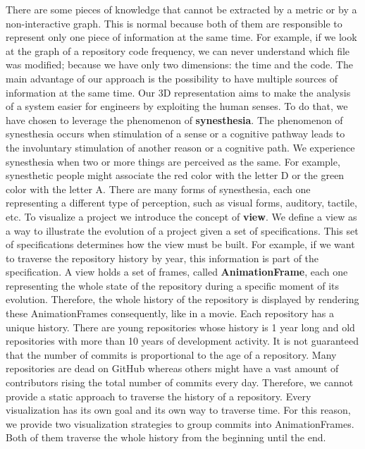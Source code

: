 There are some pieces of knowledge that cannot be extracted by a metric or by a non-interactive graph. This is normal because both of them are responsible to represent only one piece of information at the same time. For example, if we look at the graph of a repository code frequency, we can never understand which file was modified; because we have only two dimensions: the time and the code. The main advantage of our approach is the possibility to have multiple sources of information at the same time. Our 3D representation aims to make the analysis of a system easier for engineers by exploiting the human senses.
To do that, we have chosen to leverage the phenomenon of \textbf{synesthesia}. The phenomenon of synesthesia occurs when stimulation of a sense or a cognitive pathway leads to the involuntary stimulation of another reason or a cognitive path. We experience synesthesia when two or more things are perceived as the same. 
For example, synesthetic people might associate the red color with the letter D or the green color with the letter A. 
There are many forms of synesthesia, each one representing a different type of perception, such as visual forms, auditory, tactile, etc.
\bigbreak
To visualize a project we introduce the concept of \textbf{view}. We define a view as a way to illustrate the evolution of a project given a set of specifications. This set of specifications determines how the view must be built. For example, if we want to traverse the repository history by year, this information is part of the specification. A view holds a set of frames, called \textbf{AnimationFrame}, each one representing the whole state of the repository during a specific moment of its evolution. Therefore, the whole history of the repository is displayed by rendering these AnimationFrames consequently, like in a movie. 
\bigbreak
Each repository has a unique history. There are young repositories whose history is 1 year long and old repositories with more than 10 years of development activity. It is not guaranteed that the number of commits is proportional to the age of a repository. Many repositories are dead on GitHub whereas others might have a vast amount of contributors rising the total number of commits every day. Therefore, we cannot provide a static approach to traverse the history of a repository. 
Every visualization has its own goal and its own way to traverse time. For this reason, we provide two visualization strategies to group commits into AnimationFrames. Both of them traverse the whole history from the beginning until the end.
